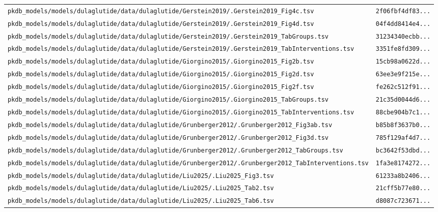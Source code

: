 \documentclass{article}
\begin{document}
\begin{longtable}{ll}
\texttt{pkdb\_models/models/dulaglutide/data/dulaglutide/Gerstein2019/.Gerstein2019\_Fig4c.tsv} & \texttt{2f06fbf4df83...} \\
\texttt{pkdb\_models/models/dulaglutide/data/dulaglutide/Gerstein2019/.Gerstein2019\_Fig4d.tsv} & \texttt{04f4dd8414e4...} \\
\texttt{pkdb\_models/models/dulaglutide/data/dulaglutide/Gerstein2019/.Gerstein2019\_TabGroups.tsv} & \texttt{31234340ecbb...} \\
\texttt{pkdb\_models/models/dulaglutide/data/dulaglutide/Gerstein2019/.Gerstein2019\_TabInterventions.tsv} & \texttt{3351fe8fd309...} \\
\texttt{pkdb\_models/models/dulaglutide/data/dulaglutide/Giorgino2015/.Giorgino2015\_Fig2b.tsv} & \texttt{15cb98a0622d...} \\
\texttt{pkdb\_models/models/dulaglutide/data/dulaglutide/Giorgino2015/.Giorgino2015\_Fig2d.tsv} & \texttt{63ee3e9f215e...} \\
\texttt{pkdb\_models/models/dulaglutide/data/dulaglutide/Giorgino2015/.Giorgino2015\_Fig2f.tsv} & \texttt{fe262c512f91...} \\
\texttt{pkdb\_models/models/dulaglutide/data/dulaglutide/Giorgino2015/.Giorgino2015\_TabGroups.tsv} & \texttt{21c35d0044d6...} \\
\texttt{pkdb\_models/models/dulaglutide/data/dulaglutide/Giorgino2015/.Giorgino2015\_TabInterventions.tsv} & \texttt{88cbe904b7c1...} \\
\texttt{pkdb\_models/models/dulaglutide/data/dulaglutide/Grunberger2012/.Grunberger2012\_Fig3ab.tsv} & \texttt{b85b8f3637b0...} \\
\texttt{pkdb\_models/models/dulaglutide/data/dulaglutide/Grunberger2012/.Grunberger2012\_Fig3d.tsv} & \texttt{785f129af4d7...} \\
\texttt{pkdb\_models/models/dulaglutide/data/dulaglutide/Grunberger2012/.Grunberger2012\_TabGroups.tsv} & \texttt{bc3642f53dbd...} \\
\texttt{pkdb\_models/models/dulaglutide/data/dulaglutide/Grunberger2012/.Grunberger2012\_TabInterventions.tsv} & \texttt{1fa3e8174272...} \\
\texttt{pkdb\_models/models/dulaglutide/data/dulaglutide/Liu2025/.Liu2025\_Fig3.tsv} & \texttt{61233a8b2406...} \\
\texttt{pkdb\_models/models/dulaglutide/data/dulaglutide/Liu2025/.Liu2025\_Tab2.tsv} & \texttt{21cff5b77e80...} \\
\texttt{pkdb\_models/models/dulaglutide/data/dulaglutide/Liu2025/.Liu2025\_Tab6.tsv} & \texttt{d8087c723671...} \\

\end{longtable}
\end{document}

